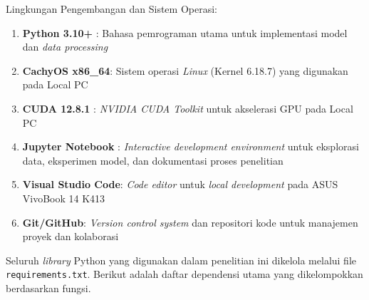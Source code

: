 Lingkungan Pengembangan dan Sistem Operasi:
\begin{enumerate}[noitemsep]
    \item \textbf{Python 3.10+} \cite{vanrossum2009python}: Bahasa pemrograman utama untuk implementasi model dan \textit{data processing}
    \item \textbf{CachyOS x86\_64}: Sistem operasi \textit{Linux} (Kernel 6.18.7) yang digunakan pada Local PC
    \item \textbf{CUDA 12.8.1} \cite{nvidia2023cuda}: \textit{NVIDIA CUDA Toolkit} untuk akselerasi GPU pada Local PC
    \item \textbf{Jupyter Notebook} \cite{kluyver2016jupyter}: \textit{Interactive development environment} untuk eksplorasi data, eksperimen model, dan dokumentasi proses penelitian
    \item \textbf{Visual Studio Code}: \textit{Code editor} untuk \textit{local development} pada ASUS VivoBook 14 K413
    \item \textbf{Git/GitHub}: \textit{Version control system} dan repositori kode untuk manajemen proyek dan kolaborasi
\end{enumerate}

\vspace{0.3cm}
\noindent
Seluruh \textit{library} Python yang digunakan dalam penelitian ini dikelola melalui file \texttt{requirements.txt}. Berikut adalah daftar dependensi utama yang dikelompokkan berdasarkan fungsi.

